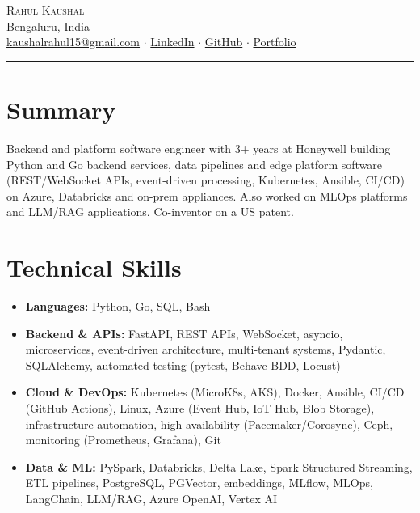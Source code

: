 \documentclass[letterpaper,9pt]{extarticle}
\newcommand{\headerlink}[2]{\href{#2}{\textcolor{linkblue}{#1}}}
\begin{document}
\begin{center}
  {\Huge \scshape Rahul Kaushal} \\[3pt]
  {\small Bengaluru, India} \\[3pt]
  \headerlink{kaushalrahul15@gmail.com}{mailto:kaushalrahul15@gmail.com}
  \enspace\textcolor{dotgray}{$\cdot$}\enspace
  \headerlink{LinkedIn}{https://www.linkedin.com/in/rahul-kaushal04/}
  \enspace\textcolor{dotgray}{$\cdot$}\enspace
  \headerlink{GitHub}{https://github.com/rahulkaushal04}
  \enspace\textcolor{dotgray}{$\cdot$}\enspace
  \headerlink{Portfolio}{https://rahulkaushal04.github.io/portfolio}
  \\[2pt]
  {\color{seprule}\rule{0.55\textwidth}{0.4pt}}
\end{center}

\section{Summary}
{\small\baselineskip=10pt\relax
Backend and platform software engineer with 3+ years at Honeywell building Python and Go backend services, data pipelines and edge platform software (REST/WebSocket APIs, event-driven processing, Kubernetes, Ansible, CI/CD) on Azure, Databricks and on-prem appliances. Also worked on MLOps platforms and LLM/RAG applications. Co-inventor on a US patent.\par}

\section{Technical Skills}
\begin{itemize}[leftmargin=0.15in, label={}, itemsep=0pt, topsep=2pt, parsep=0pt]
  \small\baselineskip=10pt\relax
  \item {\textbf{Languages:} Python, Go, SQL, Bash}
  \item \small{\textbf{Backend \& APIs:} FastAPI, REST APIs, WebSocket, asyncio, microservices, event-driven architecture, multi-tenant systems, Pydantic, SQLAlchemy, automated testing (pytest, Behave BDD, Locust)}
  \item \small{\textbf{Cloud \& DevOps:} Kubernetes (MicroK8s, AKS), Docker, Ansible, CI/CD (GitHub Actions), Linux, Azure (Event Hub, IoT Hub, Blob Storage), infrastructure automation, high availability (Pacemaker/Corosync), Ceph, monitoring (Prometheus, Grafana), Git}
  \item \small{\textbf{Data \& ML:} PySpark, Databricks, Delta Lake, Spark Structured Streaming, ETL pipelines, PostgreSQL, PGVector, embeddings, MLflow, MLOps, LangChain, LLM/RAG, Azure OpenAI, Vertex AI}
  \end{itemize}
\end{document}
